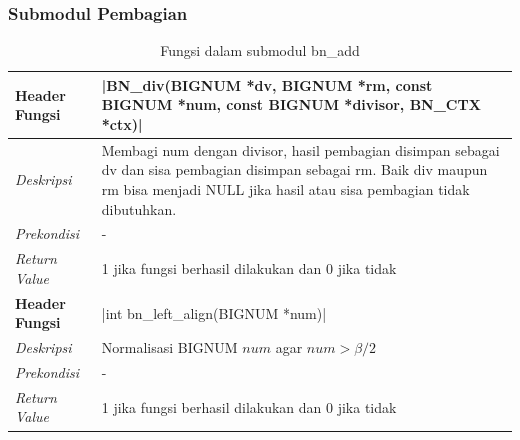     \subsubsection{Submodul Pembagian}
      \begin{table}[h]
        \caption{Fungsi dalam submodul bn\_add}
        \begin{tabular}{R{2.8cm}L{10.5cm}}
          \toprule
          \textbf{Header Fungsi} & |BN_div(BIGNUM *dv, BIGNUM *rm, const BIGNUM *num, const BIGNUM *divisor, BN_CTX *ctx)|                                                                                                       \\ \midrule
          \textit{Deskripsi}     & Membagi num dengan divisor, hasil pembagian disimpan sebagai dv dan sisa pembagian disimpan sebagai rm. Baik div maupun rm bisa menjadi NULL jika hasil atau sisa pembagian tidak dibutuhkan. \\
          \textit{Prekondisi}    & -                                                                                                                                                                                             \\
          \textit{Return Value}  & 1 jika fungsi berhasil dilakukan dan 0 jika tidak
          \\ \bottomrule
          \textbf{Header Fungsi} & |int bn_left_align(BIGNUM *num)|                                                                                                                                                              \\ \midrule
          \textit{Deskripsi}     & Normalisasi BIGNUM $num$ agar $num > \beta/2$                                                                                                                                                 \\
          \textit{Prekondisi}    & -                                                                                                                                                                                             \\
          \textit{Return Value}  & 1 jika fungsi berhasil dilakukan dan 0 jika tidak
          \\ \bottomrule
        \end{tabular}

      \end{table}

